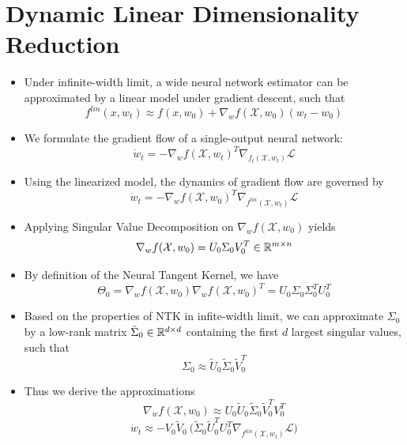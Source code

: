 \documentclass[t]{beamer}
\begin{document}

\section{Dynamic Linear Dimensionality Reduction}

\begin{frame}
 \vspace{1cm}
\begin{itemize}
\item Under infinite-width limit, a wide neural network estimator can be approximated by a linear model under gradient descent, such that
\[ f^{\textit{lin}}(x,w_t) \approx f(x,w_0) + \nabla_wf(\mathcal{X}, w_0)(w_t-w_0) \]
\item We formulate the gradient flow of a single-output neural network:
\[ \dot{w}_t = - \nabla_w f(\mathcal{X}, w_t)^T\nabla_{f_t(\mathcal{X},w_t)} \mathcal{L} \] 
\item Using the linearized model, the dynamics of gradient flow are governed by
\[ \dot{w}_t = - \nabla_w f(\mathcal{X},w_0)^T\nabla_{f^{\textit{lin}}(\mathcal{X}, w_t)} \mathcal{L} \]
\end{itemize}
\end{frame}



\begin{frame}
\begin{itemize}
\item Applying Singular Value Decomposition on $\nabla_w f(\mathcal{X}, w_0)$ yields
\[ \nabla_w f(\mathcal{X}, w_0) = U_0\Sigma_0V_0^T \in \mathbb{R}^{m \times n} \]
\item By definition of the Neural Tangent Kernel, we have
\[ \Theta_0 = \nabla_w f(\mathcal{X}, w_0) \nabla_w f(\mathcal{X}, w_0)^T = U_0 \Sigma_0 \Sigma_0^TU_0^T \]
\item Based on the properties of NTK in infite-width limit, we can approximate $\Sigma_0$ by a low-rank matrix $\tilde{\Sigma}_0 \in \mathbb{R}^{d \times d}$ containing the first $d$ largest singular values, such that
\[ \Sigma_0 \approx \tilde{U}_0\tilde{\Sigma}_0\tilde{V}_0^T \]
\item Thus we derive the approximations
\[ \nabla_w f(\mathcal{X}, w_0) \approx U_0 \tilde{U}_0\tilde{\Sigma}_0\tilde{V}_0^TV_0^T \]
\[ \dot{w}_t \approx - V_0\tilde{V}_0 \ \big (\tilde{\Sigma}_0\tilde{U}_0^TU_0^T \nabla_{f^{\textit{lin}}(\mathcal{X}, w_t)}\mathcal{L} \big )  \]
\end{itemize}
\end{frame}
\end{document}
